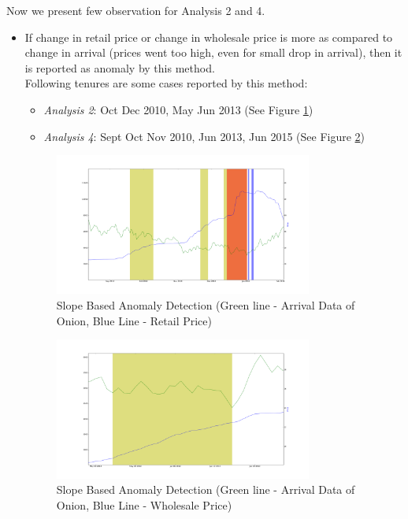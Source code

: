 \documentclass[a4paper,10pt]{report}
\begin{document}
		
		Now we present few observation for Analysis 2 and 4.
		
		\begin{itemize}
			\item If change in retail price or change in wholesale price is more as compared to change in arrival (prices went too high, even for small drop in arrival), then it is reported as anomaly by this method.\\
			
			Following tenures are some cases reported by this method:
			\begin{itemize}
				\item \textit{Analysis 2}: Oct Dec 2010, May Jun 2013 (See Figure \ref{fig:12121})
				\item \textit{Analysis 4}: Sept Oct Nov 2010, Jun 2013, Jun 2015 (See Figure \ref{fig:12141})
			\end{itemize}	
			
			\begin{figure}[H]
		    	\centering
  		    	\includegraphics[width=0.8\textwidth]{graphs/12121.png}
		    	\caption{Slope Based Anomaly Detection (Green line - Arrival Data of Onion, Blue Line - Retail Price)}
		    	\label{fig:12121}
			\end{figure}
			
			\begin{figure}[H]
		    	\centering
  		    	\includegraphics[width=0.8\textwidth]{graphs/12141.png}
		    	\caption{Slope Based Anomaly Detection (Green line - Arrival Data of Onion, Blue Line - Wholesale Price)}
		    	\label{fig:12141}
			\end{figure}
			

\end{itemize}
\end{document}
